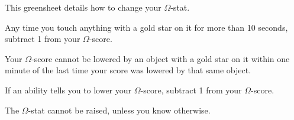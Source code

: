 \documentclass[green]{guildcamp1}
\begin{document}
\name{\gVirus{}}

This greensheet details how to change your $\Omega$-stat.

\begin{enum}[lowering]
  \item Any time you touch anything with a gold star  on it for more than 10 seconds, subtract 1 from your $\Omega$-score.
  \item Your $\Omega$-score cannot be lowered by an object with a gold star on it within one minute of the last time your score was lowered by that same object.
  \item If an ability tells you to lower your $\Omega$-score, subtract 1 from your $\Omega$-score.

\end{enum}

The $\Omega$-stat cannot be raised, unless you know otherwise.
\end{document}
